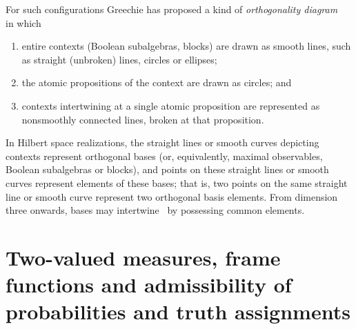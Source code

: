 \documentclass[%
  twocolumn,
 showpacs,
 showkeys,
 preprintnumbers,
 amsmath,amssymb,
 aps,
  pra,
  longbibliography,
 floatfix,
 ]{revtex4-1}
\begin{document}
For such configurations Greechie has proposed a kind of {\em orthogonality diagram}~\cite{greechie:71,kalmbach-83,svozil-tkadlec}
in which
\begin{enumerate}
\item
entire contexts (Boolean subalgebras, blocks) are drawn as smooth lines, such as straight (unbroken) lines, circles or ellipses;
\item
the atomic propositions of the context are drawn as circles; and
\item
contexts intertwining at a single atomic proposition are represented as nonsmoothly connected lines, broken at that proposition.
\end{enumerate}

In Hilbert space realizations,
the straight lines or smooth curves depicting contexts represent orthogonal bases (or, equivalently, maximal observables, Boolean subalgebras or blocks),
and points on these straight lines or smooth curves represent elements of these bases;
that is, two points  on the same straight line or smooth curve represent two orthogonal basis elements.
From dimension three onwards, bases may intertwine~\cite{Gleason} by possessing common elements.

\section{Two-valued measures, frame functions and admissibility of probabilities and truth assignments}
\label{2017-b-admissability}
\end{document}
